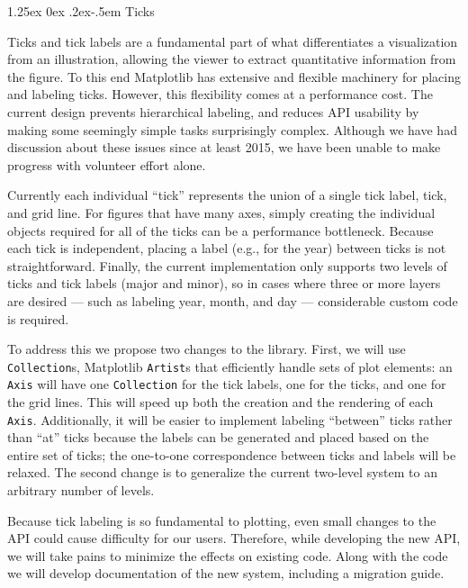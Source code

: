 \documentclass[12pt]{article}
\makeatletter
\numberwithin{page}{section}
\renewcommand{\paragraph}{%
  \@startsection{paragraph}{4}%
  {\z@}{1.25ex \@plus 0ex \@minus .2ex}{-.5em}%
  {\normalfont\normalsize\itshape\bfseries}%
}
\makeatother
\begin{document}
\paragraph{Ticks}

Ticks and tick labels are a fundamental part of what differentiates a
visualization from an illustration, allowing the viewer to extract quantitative
information from the figure.  To this end Matplotlib has extensive and flexible
machinery for placing and labeling ticks.  However, this flexibility comes at a
performance cost. The current design prevents hierarchical
labeling, and reduces API usability by making some seemingly simple tasks
surprisingly complex. Although we have had discussion about these issues since
at least 2015, we have been unable to make progress with
volunteer effort alone.


Currently each individual ``tick''
represents the union of a single tick label, tick, and grid line.  For
figures that have many axes, simply creating the individual objects required
for all of the ticks can be a performance bottleneck.
Because each tick is independent, placing a label (e.g., for the year) between
ticks is not straightforward.  Finally, the current implementation only supports
two levels of ticks and tick labels (major and minor), so in cases where three or
more layers are desired ---
such as labeling year, month, and day --- considerable custom code is required.

To address this we propose two changes to the library.  First, we will use
\texttt{Collection}s, Matplotlib \texttt{Artist}s that efficiently handle sets of plot
elements: an \texttt{Axis} will have one \texttt{Collection} for the tick labels, one for the
ticks, and one for the grid lines.  This will speed up both the creation and
the rendering of each \texttt{Axis}.
Additionally, it will be easier to implement
labeling ``between'' ticks rather than ``at'' ticks because the labels can be
generated and placed based on the entire set of ticks; the one-to-one
correspondence between ticks and labels will be relaxed.
The second change is to generalize
the current two-level system to an arbitrary number of levels.

Because tick labeling is so fundamental to plotting, even small changes to the
API could cause difficulty for our users. Therefore, while developing the
new API, we will take pains to minimize the effects on existing code. Along with the code we will
develop documentation of the new system, including a migration guide.
\end{document}
